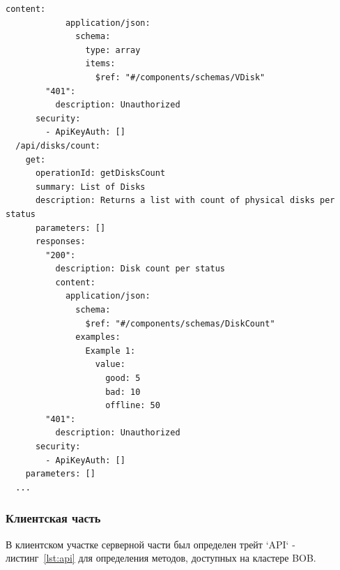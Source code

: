 \begin{lstlisting}[label=lst:openapi, caption={Часть запросов согласно спецификации OpenAPI}, style=yaml]
          content:
            application/json:
              schema:
                type: array
                items:
                  $ref: "#/components/schemas/VDisk"
        "401":
          description: Unauthorized
      security:
        - ApiKeyAuth: []
  /api/disks/count:
    get:
      operationId: getDisksCount
      summary: List of Disks
      description: Returns a list with count of physical disks per status
      parameters: []
      responses:
        "200":
          description: Disk count per status
          content:
            application/json:
              schema:
                $ref: "#/components/schemas/DiskCount"
              examples:
                Example 1:
                  value:
                    good: 5
                    bad: 10
                    offline: 50
        "401":
          description: Unauthorized
      security:
        - ApiKeyAuth: []
    parameters: []
  ...
\end{lstlisting}

\subsubsection{Клиентская часть}
В клиентском участке серверной части был определен трейт `API` - листинг~\ref{lst:api} для определения методов, доступных на кластере BOB.

